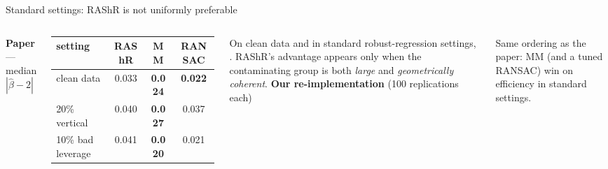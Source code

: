 \documentclass[aspectratio=169,9pt]{beamer}
\begin{document}
\begin{frame}{Standard settings: RAShR is not uniformly preferable}
\begin{columns}[T]
\textbf{Paper} --- median $|\hat\beta-2|$\medskip

\renewcommand{\arraystretch}{1.3}
\begin{tabular}{@{}lccc@{}}
\toprule setting & RAShR & MM & RANSAC\\\midrule
clean data & 0.033 & \textbf{0.024} & \textbf{0.022}\\
20\% vertical & 0.040 & \textbf{0.027} & 0.037\\
10\% bad leverage & 0.041 & \textbf{0.020} & 0.021\\
\bottomrule\end{tabular}\medskip

{\small On clean data and in standard robust-regression settings, . RAShR's advantage appears only when the contaminating group is both \emph{large} and \emph{geometrically coherent}.}
\textbf{Our re-implementation} (100 replications each)\medskip

\renewcommand{\arraystretch}{1.3}\small
\resizebox{\linewidth}{!}{}\medskip

{\small Same ordering as the paper: MM (and a tuned RANSAC) win on efficiency in standard settings.}
\end{columns}
\end{frame}
\end{document}
